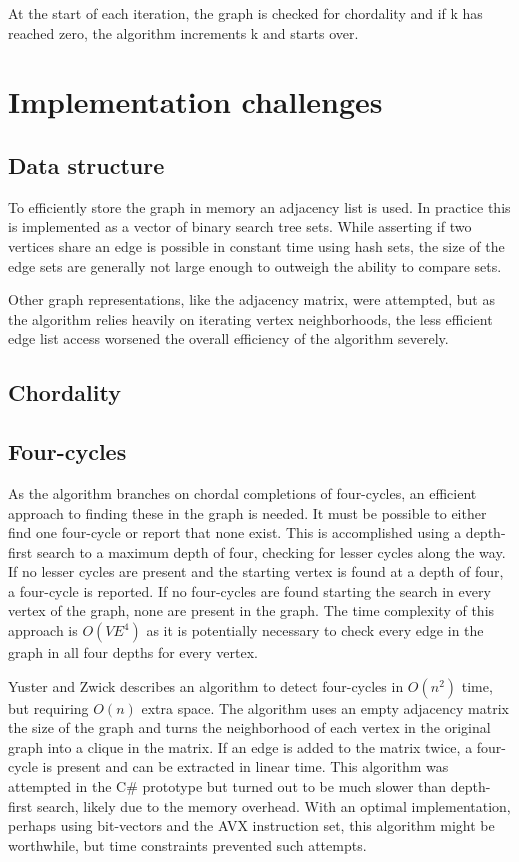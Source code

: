 \documentclass{article}
\begin{document}
		At the start of each iteration, the graph is checked for chordality and if k has reached zero, the algorithm increments k and starts over.

	\section{Implementation challenges}

		\subsection{Data structure}
		To efficiently store the graph in memory an adjacency list is used.
		In practice this is implemented as a vector of binary search tree sets.
		While asserting if two vertices share an edge is possible in constant time using hash sets, the size of the edge sets are generally not large enough to outweigh the ability to compare sets.

		Other graph representations, like the adjacency matrix, were attempted, but as the algorithm relies heavily on iterating vertex neighborhoods, the less efficient edge list access worsened the overall efficiency of the algorithm severely.

		\subsection{Chordality}

		\subsection{Four-cycles}
		As the algorithm branches on chordal completions of four-cycles, an efficient approach to finding these in the graph is needed.
		It must be possible to either find one four-cycle or report that none exist.
		This is accomplished using a depth-first search to a maximum depth of four, checking for lesser cycles along the way.
		If no lesser cycles are present and the starting vertex is found at a depth of four, a four-cycle is reported.
		If no four-cycles are found starting the search in every vertex of the graph, none are present in the graph.
		The time complexity of this approach is $O(VE^4)$ as it is potentially necessary to check every edge in the graph in all four depths for every vertex.

		Yuster and Zwick\cite{finding-even-cycles} describes an algorithm to detect four-cycles in $O(n^2)$ time, but requiring $O(n)$ extra space.
		The algorithm uses an empty adjacency matrix the size of the graph and turns the neighborhood of each vertex in the original graph into a clique in the matrix.
		If an edge is added to the matrix twice, a four-cycle is present and can be extracted in linear time.
		This algorithm was attempted in the C\# prototype but turned out to be much slower than depth-first search, likely due to the memory overhead.
		With an optimal implementation, perhaps using bit-vectors and the AVX instruction set, this algorithm might be worthwhile, but time constraints prevented such attempts.
\end{document}
